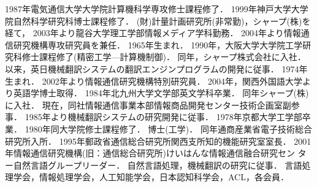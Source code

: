 \begin{biography}
{1987年電気通信大学大学院計算機科学専攻修士課程修了．
1999年神戸大学大学院自然科学研究科博士課程修了．
(財)計量計画研究所(非常勤)，シャープ(株)を経て，
2003年より龍谷大学理工学部情報メディア学科勤務．
2004年より情報通信研究機構専攻研究員を兼任．}
{1965年生まれ．
1990年，大阪大学大学院工学研究科修士課程修了(精密工学—計算機制御)．
同年，シャープ株式会社に入社．
以来，英日機械翻訳システムの翻訳エンジンプログラムの開発に従事．}
{1974年生まれ．
2002年より情報通信研究機構特別研究員．
2004年，関西外国語大学より英語学博士取得．}
{1984年北九州大学文学部英文学科卒業．
同年シャープ(株) に入社．
現在，同社情報通信事業本部情報商品開発センター技術企画室副参事．
1985年より機械翻訳システムの研究開発に従事．}
{1978年京都大学工学部卒業．
1980年同大学院修士課程修了．
博士(工学)．
同年通商産業省電子技術総合研究所入所．
1995年郵政省通信総合研究所関西支所知的機能研究室室長．
2001年情報通信研究機構(旧：通信総合研究所)けいはんな情報通信融合研究セン
ター自然言語グループリーダー．
自然言語処理，機械翻訳の研究に従事．
言語処理学会，情報処理学会，人工知能学会，日本認知科学会，ACL，各会員．}

\end{biography}



